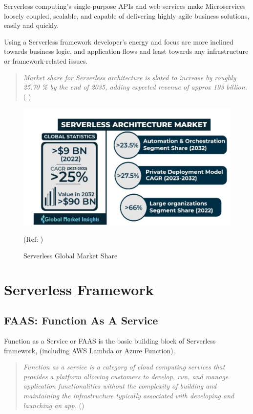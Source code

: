 \documentclass{article}
\begin{document}
\begin{flushleft}
Serverless computing's single-purpose APIs and web services make Microservices loosely coupled, scalable, and capable of delivering highly agile business solutions, easily and quickly.

Using a Serverless framework developer’s energy and focus are more inclined towards business logic, and application flows and least towards any infrastructure or framework-related issues.
\pagebreak
\end{flushleft}
\begin{quote}
   \textit{Market share for Serverless architecture is slated to increase by roughly 25.70 \% by the end of 2035, adding expected revenue of approx 193 billion. } \\ ( \cite{GMI_3796_2022} )
\end{quote}

\begin{figure}[h]
    \centering
    \includegraphics[width=0.5\linewidth]{images/Serverless-Arch-market.PNG}
    \caption{Serverless Global Market Share}
    \label{Serverless_global_market_share}
    (Ref: \cite{GMI_3796_2022} )
\end{figure}

\pagebreak

\section{Serverless Framework}
\subsection{FAAS: Function As A Service}
\par
\justifying
Function as a Service or \gls{FAAS} is the basic building block of Serverless framework, (including AWS Lambda or Azure Function). 
\begin{quote}
\begin{flushleft}
\textit{Function as a service is a category of cloud computing services that provides a platform allowing customers to develop, run, and manage application functionalities without the complexity of building and maintaining the infrastructure typically associated with developing and launching an app.}
\hfill \break
(\cite{Wiki_function_as_a_service})
\end{flushleft}
\end{quote}
\end{document}
